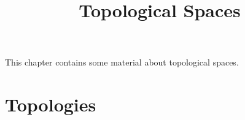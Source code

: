 

%



\title{Topological Spaces}

\maketitle

\label{section-phantom}

This chapter contains some material about topological spaces.

\ChapterTableOfContents

\section{Topologies}\label{section-topologies}
